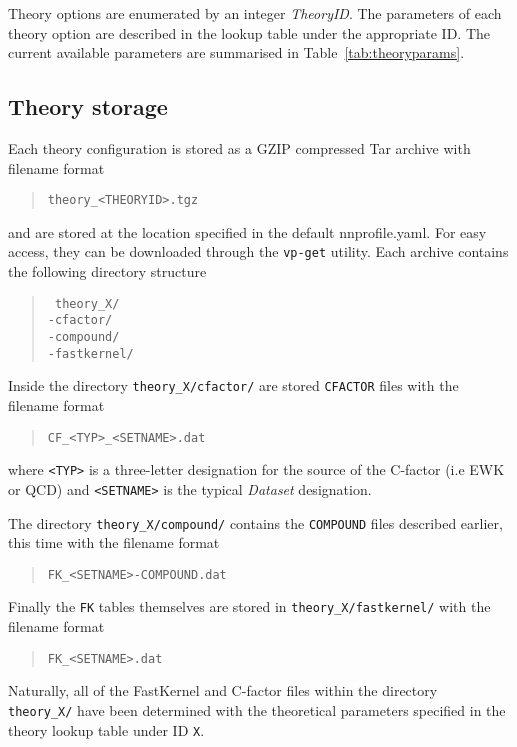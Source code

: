 \documentclass[11pt]{article}
\begin{document}
Theory options are enumerated by an integer {\it TheoryID}. The parameters of
each theory option are described in the lookup table under the appropriate ID.
The current available parameters are summarised in Table~\ref{tab:theoryparams}.

\subsection{Theory storage}

Each theory configuration is stored as a GZIP compressed Tar archive with
filename format
%
\begin{quotation}
    {\tt theory\_<THEORYID>.tgz}
\end{quotation}
%
and are stored at the location specified in the default nnprofile.yaml. For easy
access, they can be downloaded through the {\tt vp-get} utility.  Each archive
contains the following directory structure
%
\begin{quotation}\noindent
{\tt
theory\_X/ \\
\-\hspace{1cm}-cfactor/\\
\-\hspace{1cm}-compound/\\
\-\hspace{1cm}-fastkernel/\\
}
\end{quotation}
%
Inside the directory {\tt theory\_X/cfactor/} are stored {\tt CFACTOR} files
with the filename format
%
\begin{quotation}\noindent
{\tt CF\_<TYP>\_<SETNAME>.dat }
\end{quotation}
%
where {\tt<TYP>} is a three-letter designation for the source of the C-factor
(i.e EWK or QCD) and {\tt<SETNAME>} is the typical {\it Dataset} designation.

The directory {\tt theory\_X/compound/} contains the {\tt COMPOUND} files
described earlier, this time with the filename format
%
\begin{quotation}\noindent
{\tt FK\_<SETNAME>-COMPOUND.dat }
\end{quotation}
%
Finally the {\tt FK} tables themselves are stored in {\tt theory\_X/fastkernel/}
with the filename format
%
\begin{quotation}\noindent
{\tt FK\_<SETNAME>.dat }
\end{quotation}
%
Naturally, all of the FastKernel and C-factor files within the directory {\tt
theory\_X/} have been determined with the theoretical parameters specified in
the theory lookup table under ID {\tt X}.
\end{document}
